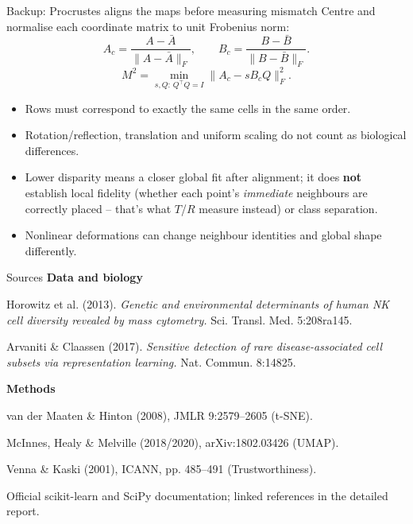 \documentclass[aspectratio=169,10pt]{beamer}
\begin{document}
\begin{frame}{Backup: Procrustes aligns the maps before measuring mismatch}
  Centre and normalise each coordinate matrix to unit Frobenius norm:
  \[ A_c=\frac{A-\bar A}{\lVert A-\bar A\rVert_F},\qquad B_c=\frac{B-\bar B}{\lVert B-\bar B\rVert_F}.\]
  \[M^2=\min_{s,Q:\,Q^\top Q=I}\lVert A_c-sB_cQ\rVert_F^2.\]
  \smallskip
  \begin{itemize}
    \item Rows must correspond to exactly the same cells in the same order.
    \item Rotation/reflection, translation and uniform scaling do not count as biological differences.
    \item Lower disparity means a closer global fit after alignment; it does \textbf{not} establish local fidelity (whether each point's \emph{immediate} neighbours are correctly placed -- that's what $T$/$R$ measure instead) or class separation.
    \item Nonlinear deformations can change neighbour identities and global shape differently.
  \end{itemize}
\end{frame}

\begin{frame}{Sources}
  \small
  \textbf{Data and biology}\par
  Horowitz et al. (2013). \emph{Genetic and environmental determinants of human NK cell diversity revealed by mass cytometry.} Sci. Transl. Med. 5:208ra145.\par
  Arvaniti \& Claassen (2017). \emph{Sensitive detection of rare disease-associated cell subsets via representation learning.} Nat. Commun. 8:14825.\par\medskip
  \textbf{Methods}\par
  van der Maaten \& Hinton (2008), JMLR 9:2579--2605 (t-SNE).\par
  McInnes, Healy \& Melville (2018/2020), arXiv:1802.03426 (UMAP).\par
  Venna \& Kaski (2001), ICANN, pp. 485--491 (Trustworthiness).\par
  Official scikit-learn and SciPy documentation; linked references in the detailed report.\par\medskip
\end{frame}
\end{document}
